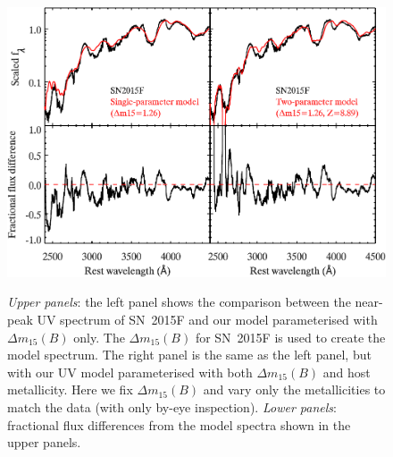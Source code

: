 \documentclass[useAMS,usenatbib]{mn2e}
\newcommand{\deltam}{\ensuremath{\Delta m_{15}}}
\begin{document}
\begin{figure}
	\centering
		\includegraphics[scale=0.8]{plot/uv_spec_15F_model.pdf}\\
                \caption{{\it Upper panels}: the left panel shows the comparison between the near-peak UV spectrum of SN~2015F and our model parameterised with $\deltam(B)$ only. The $\deltam(B)$ for SN~2015F \citep[1.26\,mag;][]{2015ApJS..221...22I} is used to create the model spectrum. The right panel is the same as the left panel, but with our UV model parameterised with both $\deltam(B)$ and host metallicity. Here we fix $\deltam(B)$ and vary only the metallicities to match the data (with only by-eye inspection). {\it Lower panels}: fractional flux differences from the model spectra shown in the upper panels.}
        \label{15F-model}
\end{figure}
\end{document}
